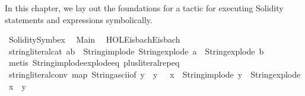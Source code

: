 %
\begin{isabellebody}%
%
%
\isadelimdocument
%
\endisadelimdocument
%
\isatagdocument
%
\isamarkuptrue%
%
\endisatagdocument
{\isafolddocument}%
%
\isadelimdocument
%
\endisadelimdocument
%
\begin{isamarkuptext}%
In this chapter, we lay out the foundations for a tactic for executing 
  Solidity statements and expressions symbolically.%
\end{isamarkuptext}\isamarkuptrue%
%
\isadelimtheory
%
\endisadelimtheory
%
\isatagtheory
{}\isamarkupfalse%
\ Solidity{\isacharunderscore}{\kern0pt}Symbex\isanewline
{}\isanewline
\ \ Main\isanewline
\ \ {\isachardoublequoteopen}HOL{\isacharminus}{\kern0pt}Eisbach{\isachardot}{\kern0pt}Eisbach{\isachardoublequoteclose}\isanewline
{}%
\endisatagtheory
{\isafoldtheory}%
%
\isadelimtheory
%
\endisadelimtheory
\isanewline
\isanewline
{}\isamarkupfalse%
\ string{\isacharunderscore}{\kern0pt}literal{\isacharunderscore}{\kern0pt}cat{\isacharcolon}{\kern0pt}\ {\isachardoublequoteopen}a{\isacharplus}{\kern0pt}b\ {\isacharequal}{\kern0pt}\ String{\isachardot}{\kern0pt}implode\ {\isacharparenleft}{\kern0pt}{\isacharparenleft}{\kern0pt}String{\isachardot}{\kern0pt}explode\ a{\isacharparenright}{\kern0pt}\ {\isacharat}{\kern0pt}\ {\isacharparenleft}{\kern0pt}String{\isachardot}{\kern0pt}explode\ b{\isacharparenright}{\kern0pt}{\isacharparenright}{\kern0pt}{\isachardoublequoteclose}\isanewline
%
\isadelimproof
\ \ %
\endisadelimproof
%
\isatagproof
{}\isamarkupfalse%
\ {\isacharparenleft}{\kern0pt}metis\ String{\isachardot}{\kern0pt}implode{\isacharunderscore}{\kern0pt}explode{\isacharunderscore}{\kern0pt}eq\ plus{\isacharunderscore}{\kern0pt}literal{\isachardot}{\kern0pt}rep{\isacharunderscore}{\kern0pt}eq{\isacharparenright}{\kern0pt}%
\endisatagproof
{\isafoldproof}%
%
\isadelimproof
\isanewline
%
\endisadelimproof
\isanewline
\isanewline
{}\isamarkupfalse%
\ string{\isacharunderscore}{\kern0pt}literal{\isacharunderscore}{\kern0pt}conv{\isacharcolon}{\kern0pt}\ {\isachardoublequoteopen}{\isacharparenleft}{\kern0pt}map\ String{\isachardot}{\kern0pt}ascii{\isacharunderscore}{\kern0pt}of\ y\ {\isacharequal}{\kern0pt}\ y{\isacharparenright}{\kern0pt}\ {\isasymLongrightarrow}\ \ {\isacharparenleft}{\kern0pt}x\ {\isacharequal}{\kern0pt}\ String{\isachardot}{\kern0pt}implode\ y{\isacharparenright}{\kern0pt}\ {\isacharequal}{\kern0pt}\ {\isacharparenleft}{\kern0pt}String{\isachardot}{\kern0pt}explode\ x\ {\isacharequal}{\kern0pt}\ y{\isacharparenright}{\kern0pt}\ {\isachardoublequoteclose}\isanewline

\end{isabellebody}
